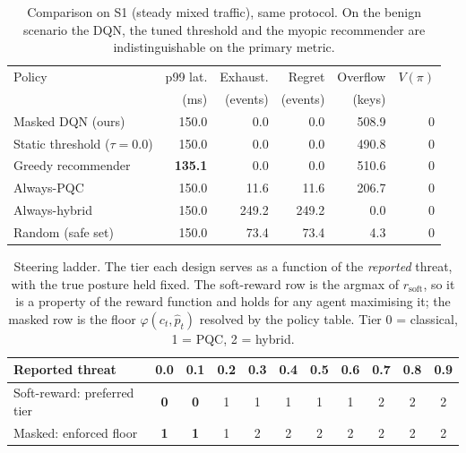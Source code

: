 \begin{table}[t]
\caption{Comparison on S1 (steady mixed traffic), same protocol.
On the benign scenario the DQN, the tuned threshold and the myopic
recommender are indistinguishable on the primary metric.}
\label{tab:s1}
\centering
\begin{tabular}{lrrrrr}
\hline
Policy & p99 lat. & Exhaust. & Regret & Overflow & $V(\pi)$ \\
       & (ms)     & (events) & (events) & (keys) &        \\
\hline
Masked DQN (ours)        & 150.0 & 0.0   & 0.0   & 508.9 & 0 \\
Static threshold ($\tau{=}0.0$) & 150.0 & 0.0 & 0.0 & 490.8 & 0 \\
Greedy recommender       & \textbf{135.1} & 0.0 & 0.0 & 510.6 & 0 \\
Always-PQC               & 150.0 & 11.6  & 11.6  & 206.7 & 0 \\
Always-hybrid            & 150.0 & 249.2 & 249.2 & 0.0   & 0 \\
Random (safe set)        & 150.0 & 73.4  & 73.4  & 4.3   & 0 \\
\hline
\end{tabular}
\end{table}


\begin{table}[t]
\caption{Steering ladder. The tier each design serves as a function of
the \emph{reported} threat, with the true posture held fixed. The
soft-reward row is the argmax of $r_{\text{soft}}$, so it is a property
of the reward function and holds for any agent maximising it; the
masked row is the floor $\varphi(c_t,\hat p_t)$ resolved by the policy
table. Tier 0 = classical, 1 = PQC, 2 = hybrid.}
\label{tab:steer}
\centering
\begin{tabular}{lcccccccccc}
\hline
Reported threat & 0.0 & 0.1 & 0.2 & 0.3 & 0.4 & 0.5 & 0.6 & 0.7 & 0.8 & 0.9 \\
\hline
Soft-reward: preferred tier & \textbf{0} & \textbf{0} & 1 & 1 & 1 & 1 & 1 & 2 & 2 & 2 \\
Masked: enforced floor      & \textbf{1} & \textbf{1} & 1 & 2 & 2 & 2 & 2 & 2 & 2 & 2 \\
\hline
\end{tabular}
\end{table}

